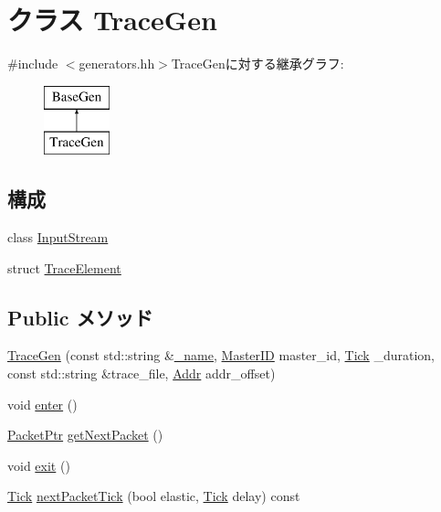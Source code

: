 \hypertarget{classTraceGen}{
\section{クラス TraceGen}
\label{classTraceGen}
}


{\ttfamily \#include $<$generators.hh$>$}TraceGenに対する継承グラフ:\begin{figure}[H]
\begin{center}
\leavevmode
\includegraphics[height=2cm]{classTraceGen}
\end{center}
\end{figure}
\subsection*{構成}
\begin{DoxyCompactItemize}
\item 
class \hyperlink{classTraceGen_1_1InputStream}{InputStream}
\item 
struct \hyperlink{structTraceGen_1_1TraceElement}{TraceElement}
\end{DoxyCompactItemize}
\subsection*{Public メソッド}
\begin{DoxyCompactItemize}
\item 
\hyperlink{classTraceGen_a6c6cce0385b1ab2fd059a9b4ac5ccd5a}{TraceGen} (const std::string \&\hyperlink{classBaseGen_a1b003dc5cfce1a4d8f9a0c4b9b589045}{\_\-name}, \hyperlink{request_8hh_ac366b729262fd8e7cbd3283da6f775cf}{MasterID} master\_\-id, \hyperlink{base_2types_8hh_a5c8ed81b7d238c9083e1037ba6d61643}{Tick} \_\-duration, const std::string \&trace\_\-file, \hyperlink{base_2types_8hh_af1bb03d6a4ee096394a6749f0a169232}{Addr} addr\_\-offset)
\item 
void \hyperlink{classTraceGen_a2759dad6560aaf485b16356d7142d69d}{enter} ()
\item 
\hyperlink{classPacket}{PacketPtr} \hyperlink{classTraceGen_a938aa9841a9a62a776afbd0768af5379}{getNextPacket} ()
\item 
void \hyperlink{classTraceGen_a358d2e2397ca11ccd17553e3c40e7901}{exit} ()
\item 
\hyperlink{base_2types_8hh_a5c8ed81b7d238c9083e1037ba6d61643}{Tick} \hyperlink{classTraceGen_a65f805b54c24ac3ce0a37716de3e8abc}{nextPacketTick} (bool elastic, \hyperlink{base_2types_8hh_a5c8ed81b7d238c9083e1037ba6d61643}{Tick} delay) const 
\end{DoxyCompactItemize}
